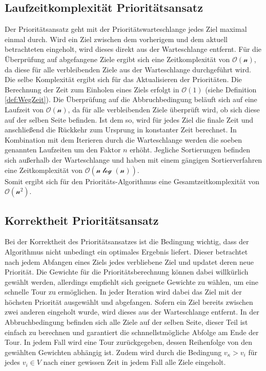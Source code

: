 \documentclass[german,version-2019-11]{uzl-thesis}
\begin{document}
\subsection{Laufzeitkomplexität Prioritätsansatz}

Der Prioritätsansatz geht mit der Prioritätswarteschlange jedes Ziel maximal einmal durch. Wird ein Ziel zwischen dem vorherigem und dem aktuell betrachteten eingeholt, wird dieses direkt aus der Warteschlange entfernt. 
Für die Überprüfung auf abgefangene Ziele ergibt sich eine Zeitkomplexität von $\mathcal{O(n)}$, da diese für alle verbleibenden Ziele aus der Warteschlange durchgeführt wird. Die selbe Komplexität ergibt sich für das Aktualisieren der Prioritäten. Die Berechnung der Zeit zum Einholen eines Ziels erfolgt in $\mathcal{O(1)}$ (siehe Definition \ref{def:WegZeit}). Die Überprüfung auf die Abbruchbedingung beläuft sich auf eine Laufzeit von $\mathcal{O(n)}$, da für alle verbleibenden Ziele überprüft wird, ob sich diese auf der selben Seite befinden. Ist dem so, wird für jedes Ziel die finale Zeit und anschließend die Rückkehr zum Ursprung in konstanter Zeit berechnet. In Kombination mit dem Iterieren durch die Warteschlange werden die soeben genannten Laufzeiten um den Faktor $n$ erhöht. Jegliche Sortierungen befinden sich außerhalb der Warteschlange und haben mit einem gängigen Sortierverfahren \cite{kaaser2014algorithmen} eine Zeitkomplexität von $\mathcal{O(n\log(n))}$. \\
Somit ergibt sich für den Prioritäts-Algorithmus eine Gesamtzeitkomplexität von $\mathcal{O(n^2)}$.

\subsection{Korrektheit Prioritätsansatz}
Bei der Korrektheit des Prioritätsansatzes ist die Bedingung wichtig, dass der Algorithmus nicht unbedingt ein optimales Ergebnis liefert. Dieser betrachtet nach jedem Abfangen eines Ziels jedes verbliebene Ziel und updatet deren neue Priorität. Die Gewichte für die Prioritätsberechnung können dabei willkürlich gewählt werden, allerdings empfiehlt sich geeignete Gewichte zu wählen, um eine schnelle Tour zu ermöglichen. In jeder Iteration wird dabei das Ziel mit der höchsten Priorität ausgewählt und abgefangen. Sofern ein Ziel bereits zwischen zwei anderen eingeholt wurde, wird dieses aus der Warteschlange entfernt. In der Abbruchbedingung befinden sich alle Ziele auf der selben Seite, dieser Teil ist einfach zu berechnen und garantiert die schnnellstmögliche Abfolge am Ende der Tour. In jedem Fall wird eine Tour zurückgegeben, dessen Reihenfolge von den gewählten Gewichten abhängig ist. Zudem wird durch die Bedingung $v_\kappa>v_i$ für jedes $v_i\in V$ nach einer gewissen Zeit in jedem Fall alle Ziele eingeholt.
\end{document}
